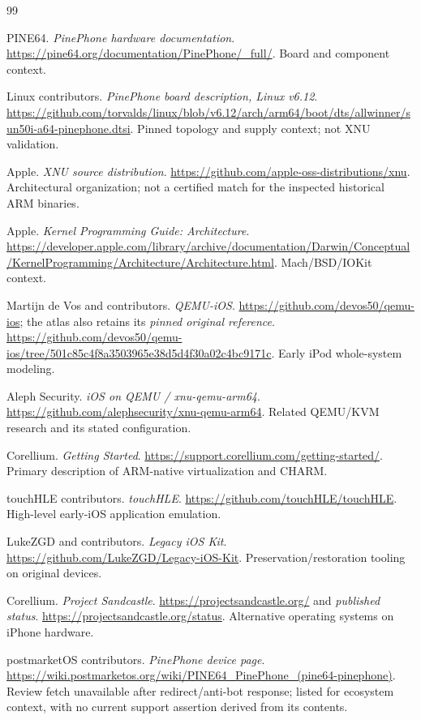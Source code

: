\documentclass[10pt,letterpaper,twocolumn]{article}
\begin{document}
\FloatBarrier\begin{thebibliography}{99}\setlength{\itemsep}{2pt}

 PINE64. \emph{PinePhone hardware documentation}. \url{https://pine64.org/documentation/PinePhone/_full/}. Board and component context.

 Linux contributors. \emph{PinePhone board description, Linux v6.12}. \url{https://github.com/torvalds/linux/blob/v6.12/arch/arm64/boot/dts/allwinner/sun50i-a64-pinephone.dtsi}. Pinned topology and supply context; not XNU validation.

 Apple. \emph{XNU source distribution}. \url{https://github.com/apple-oss-distributions/xnu}. Architectural organization; not a certified match for the inspected historical ARM binaries.

 Apple. \emph{Kernel Programming Guide: Architecture}. \url{https://developer.apple.com/library/archive/documentation/Darwin/Conceptual/KernelProgramming/Architecture/Architecture.html}. Mach/BSD/IOKit context.

 Martijn de Vos and contributors. \emph{QEMU-iOS}. \url{https://github.com/devos50/qemu-ios}; the atlas also retains its \emph{pinned original reference}. \url{https://github.com/devos50/qemu-ios/tree/501c85c4f8a3503965e38d5d4f30a02c4bc9171c}. Early iPod whole-system modeling.

 Aleph Security. \emph{iOS on QEMU / xnu-qemu-arm64}. \url{https://github.com/alephsecurity/xnu-qemu-arm64}. Related QEMU/KVM research and its stated configuration.

 Corellium. \emph{Getting Started}. \url{https://support.corellium.com/getting-started/}. Primary description of ARM-native virtualization and CHARM.

 touchHLE contributors. \emph{touchHLE}. \url{https://github.com/touchHLE/touchHLE}. High-level early-iOS application emulation.

 LukeZGD and contributors. \emph{Legacy iOS Kit}. \url{https://github.com/LukeZGD/Legacy-iOS-Kit}. Preservation/restoration tooling on original devices.

 Corellium. \emph{Project Sandcastle}. \url{https://projectsandcastle.org/} and \emph{published status}. \url{https://projectsandcastle.org/status}. Alternative operating systems on iPhone hardware.

 postmarketOS contributors. \emph{PinePhone device page}. \url{https://wiki.postmarketos.org/wiki/PINE64_PinePhone_(pine64-pinephone)}. Review fetch unavailable after redirect/anti-bot response; listed for ecosystem context, with no current support assertion derived from its contents.


\end{thebibliography}
\end{document}
